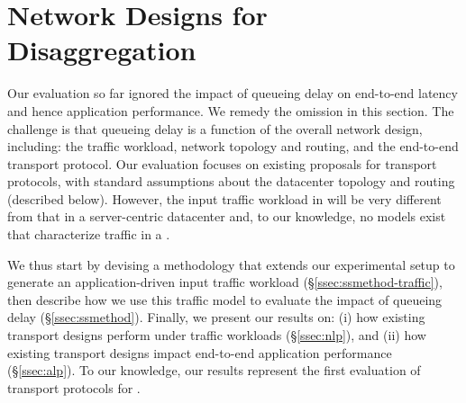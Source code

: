\vspace{-0.1in}
\section{Network Designs for Disaggregation}
\label{sec:existing}
\vspace{-0.05in}
Our evaluation so far ignored the impact of queueing delay on end-to-end latency and hence application performance. We remedy the omission in this section.
The challenge is that queueing delay is a function of the overall network design, including: the traffic workload, network topology and routing, and the end-to-end transport protocol. Our evaluation focuses on existing proposals for transport protocols, with standard assumptions about the datacenter topology and routing (described below). However, the input traffic workload in \dis will be very different from that in a server-centric datacenter and, to our knowledge, no models exist that characterize traffic in a \dis. 

We thus start by devising a methodology that extends our experimental setup to generate an application-driven input traffic workload (\S\ref{ssec:ssmethod-traffic}), then describe how we use this traffic model to evaluate the impact of queueing delay (\S\ref{ssec:ssmethod}). Finally, we present our results on: (i) how existing transport designs perform under \dis traffic workloads (\S\ref{ssec:nlp}), and (ii) how existing transport designs impact end-to-end application performance (\S\ref{ssec:alp}). To our knowledge, our results represent the first evaluation of transport protocols for \dis. 

